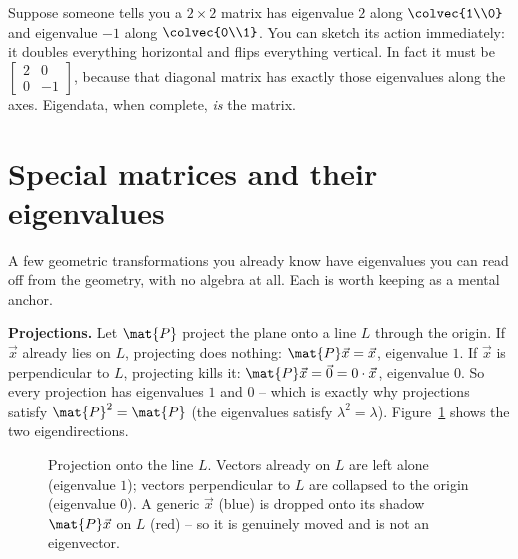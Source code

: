\begin{example}
\label{ch23:ex-readoff}
Suppose someone tells you a $2\times 2$ matrix has eigenvalue $2$ along
$\colvec{1\\0}$ and eigenvalue $-1$ along $\colvec{0\\1}$. You can sketch its
action immediately: it doubles everything horizontal and flips everything vertical.
In fact it must be $\begin{bmatrix}2&0\\0&-1\end{bmatrix}$, because that diagonal
matrix has exactly those eigenvalues along the axes. Eigendata, when complete,
\emph{is} the matrix.
\end{example}

\section{Special matrices and their eigenvalues}
\label{ch23:special}

A few geometric transformations you already know have eigenvalues you can read off
from the geometry, with no algebra at all. Each is worth keeping as a mental
anchor.

\textbf{Projections.} Let $\mat{P}$ project the plane onto a line $L$ through the
origin. If $\vec{x}$ already lies on $L$, projecting does nothing:
$\mat{P}\vec{x}=\vec{x}$, eigenvalue $1$. If $\vec{x}$ is perpendicular to $L$,
projecting kills it: $\mat{P}\vec{x}=\vec{0}=0\cdot\vec{x}$, eigenvalue $0$. So
every projection has eigenvalues $1$ and $0$ -- which is exactly why projections
satisfy $\mat{P}^2=\mat{P}$ (the eigenvalues satisfy $\lambda^2=\lambda$).
Figure~\ref{ch23:fig-projection} shows the two eigendirections.

\begin{figure}[H]
\centering
{}
\caption{Projection onto the line $L$. Vectors already on $L$ are left alone
(eigenvalue $1$); vectors perpendicular to $L$ are collapsed to the origin
(eigenvalue $0$). A generic $\vec{x}$ (blue) is dropped onto its shadow
$\mat{P}\vec{x}$ on $L$ (red) -- so it is genuinely moved and is not an eigenvector.}
\label{ch23:fig-projection}
\end{figure}

